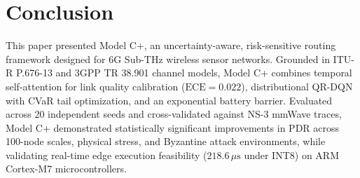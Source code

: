 \documentclass[conference]{IEEEtran}
\begin{document}
\section{Conclusion}
This paper presented Model C+, an uncertainty-aware, risk-sensitive routing framework designed for 6G Sub-THz wireless sensor networks. Grounded in ITU-R P.676-13 and 3GPP TR 38.901 channel models, Model C+ combines temporal self-attention for link quality calibration ($\text{ECE}=0.022$), distributional QR-DQN with CVaR tail optimization, and an exponential battery barrier. Evaluated across 20 independent seeds and cross-validated against NS-3 mmWave traces, Model C+ demonstrated statistically significant improvements in PDR across 100-node scales, physical stress, and Byzantine attack environments, while validating real-time edge execution feasibility ($218.6\,\mu\text{s}$ under INT8) on ARM Cortex-M7 microcontrollers.
\end{document}
